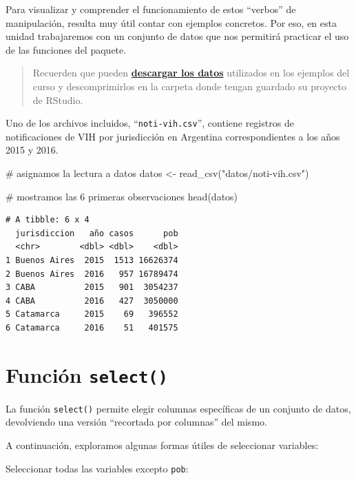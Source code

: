 \documentclass[
  spanish,
  a4paper,
]{scrbook}
\newenvironment{Shaded}{\begin{snugshade}}{\end{snugshade}}
\newcommand{\CommentTok}[1]{\textcolor[rgb]{0.37,0.37,0.37}{#1}}
\newcommand{\FunctionTok}[1]{\textcolor[rgb]{0.28,0.35,0.67}{#1}}
\newcommand{\NormalTok}[1]{\textcolor[rgb]{0.00,0.23,0.31}{#1}}
\newcommand{\OtherTok}[1]{\textcolor[rgb]{0.00,0.23,0.31}{#1}}
\newcommand{\StringTok}[1]{\textcolor[rgb]{0.13,0.47,0.30}{#1}}
\begin{document}
Para visualizar y comprender el funcionamiento de estos ``verbos'' de
manipulación, resulta muy útil contar con ejemplos concretos. Por eso,
en esta unidad trabajaremos con un conjunto de datos que nos permitirá
practicar el uso de las funciones del paquete.

\begin{quote}
Recuerden que pueden
\href{../files/datos_y_paquetes.zip}{\textbf{descargar los datos}}
utilizados en los ejemplos del curso y descomprimirlos en la carpeta
donde tengan guardado su proyecto de RStudio.
\end{quote}

Uno de los archivos incluidos, ``\texttt{noti-vih.csv}'', contiene
registros de notificaciones de VIH por jurisdicción en Argentina
correspondientes a los años 2015 y 2016.

\begin{Shaded}
\begin{Highlighting}[]
\CommentTok{\# asignamos la lectura a datos}
\NormalTok{datos }\OtherTok{\textless{}{-}} \FunctionTok{read\_csv}\NormalTok{(}\StringTok{"datos/noti{-}vih.csv"}\NormalTok{)}

\CommentTok{\# mostramos las 6 primeras observaciones}
\FunctionTok{head}\NormalTok{(datos)}
\end{Highlighting}
\end{Shaded}

\begin{verbatim}
# A tibble: 6 x 4
  jurisdiccion   año casos      pob
  <chr>        <dbl> <dbl>    <dbl>
1 Buenos Aires  2015  1513 16626374
2 Buenos Aires  2016   957 16789474
3 CABA          2015   901  3054237
4 CABA          2016   427  3050000
5 Catamarca     2015    69   396552
6 Catamarca     2016    51   401575
\end{verbatim}

\section{\texorpdfstring{Función
\texttt{select()}}{Función select()}}\label{funciuxf3n-select}

La función \texttt{select()} permite elegir columnas específicas de un
conjunto de datos, devolviendo una versión ``recortada por columnas''
del mismo.

A continuación, exploramos algunas formas útiles de seleccionar
variables:

Seleccionar todas las variables excepto \texttt{pob}:
\end{document}

